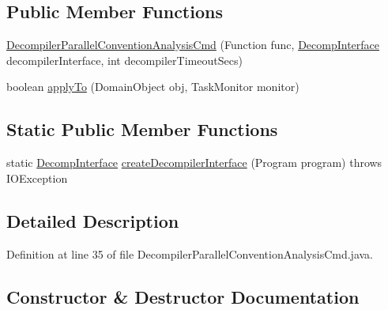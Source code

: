 \subsection*{Public Member Functions}
\begin{DoxyCompactItemize}
\item 
\mbox{\hyperlink{classghidra_1_1app_1_1cmd_1_1function_1_1_decompiler_parallel_convention_analysis_cmd_aa65d3fa143d32d0a4e1daa2ae29e06a8}{Decompiler\+Parallel\+Convention\+Analysis\+Cmd}} (Function func, \mbox{\hyperlink{classghidra_1_1app_1_1decompiler_1_1_decomp_interface}{Decomp\+Interface}} decompiler\+Interface, int decompiler\+Timeout\+Secs)
\item 
boolean \mbox{\hyperlink{classghidra_1_1app_1_1cmd_1_1function_1_1_decompiler_parallel_convention_analysis_cmd_a3aba464e1119b814fe01b9b796c8d6c7}{apply\+To}} (Domain\+Object obj, Task\+Monitor monitor)
\end{DoxyCompactItemize}
\subsection*{Static Public Member Functions}
\begin{DoxyCompactItemize}
\item 
static \mbox{\hyperlink{classghidra_1_1app_1_1decompiler_1_1_decomp_interface}{Decomp\+Interface}} \mbox{\hyperlink{classghidra_1_1app_1_1cmd_1_1function_1_1_decompiler_parallel_convention_analysis_cmd_a6041f758e847f56c0fb2d7b7f7307a16}{create\+Decompiler\+Interface}} (Program program)  throws I\+O\+Exception 
\end{DoxyCompactItemize}


\subsection{Detailed Description}


Definition at line 35 of file Decompiler\+Parallel\+Convention\+Analysis\+Cmd.\+java.



\subsection{Constructor \& Destructor Documentation}
\mbox{\label{classghidra_1_1app_1_1cmd_1_1function_1_1_decompiler_parallel_convention_analysis_cmd_aa65d3fa143d32d0a4e1daa2ae29e06a8}} 
